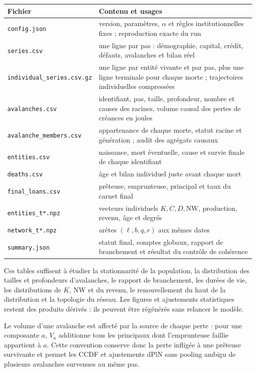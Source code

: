 \documentclass[11pt,a4paper]{article}
\newcommand{\code}[1]{\texttt{#1}}
\newcommand{\NW}{\mathrm{NW}}
\begin{document}
\begin{longtable}{p{}p{}}
\toprule
Fichier & Contenu et usages \\
\midrule
\endhead
\code{config.json} & version, paramètres, $\alpha$ et règles institutionnelles
fixes ; reproduction exacte du run \\
\code{series.csv} & une ligne par pas : démographie, capital, crédit, défauts,
avalanches et bilan réel \\
\code{individual\_series.csv.gz} & une ligne par entité vivante et par pas,
plus une ligne terminale pour chaque morte ; trajectoires individuelles
compressées \\
\code{avalanches.csv} & identifiant, pas, taille, profondeur, nombre et causes
des racines, volume causal des pertes de créances en joules \\
\code{avalanche\_members.csv} & appartenance de chaque morte, statut racine et
génération ; audit des agrégats causaux \\
\code{entities.csv} & naissance, mort éventuelle, cause et survie finale de
chaque identifiant \\
\code{deaths.csv} & âge et bilan individuel juste avant chaque mort \\
\code{final\_loans.csv} & prêteuse, emprunteuse, principal et taux du carnet
final \\
\code{entities\_t*.npz} & vecteurs individuels $K,C,D,\NW$,
production, revenu, âge et degrés \\
\code{network\_t*.npz} & arêtes $(\ell,b,q,r)$ aux mêmes dates \\
\code{summary.json} & statut final, comptes globaux, rapport de branchement et
résultat du contrôle de cohérence \\
\bottomrule
\end{longtable}

Ces tables suffisent à étudier la stationnarité de la population, la
distribution des tailles et profondeurs d'avalanches, le rapport de
branchement, les durées de vie, les distributions de $K$, $\NW$ et du revenu,
le renouvellement du haut de la distribution et la topologie du réseau. Les
figures et ajustements statistiques restent des produits dérivés : ils
peuvent être régénérés sans relancer le modèle.

Le volume d'une avalanche est affecté par la source de chaque perte : pour
une composante $a$, $V_a$ additionne tous les principaux dont l'emprunteuse
faillie appartient à $a$. Cette convention conserve donc la perte infligée à
une prêteuse survivante et permet les CCDF et ajustements dPlN sans pooling
ambigu de plusieurs avalanches survenues au même pas.
\end{document}
